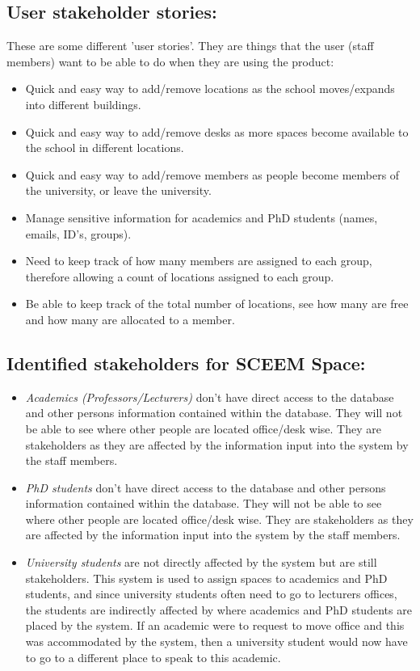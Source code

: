 \documentclass[11pt,a4paper]{article}
\begin{document}
\subsection{User stakeholder stories:}
These are some different 'user stories'. They are things that the user (staff members) want to be able to do when they are using the product:
\begin{itemize}
        \item Quick and easy way to add/remove locations as the school moves/expands  into different buildings.
        \item Quick and easy way to add/remove desks as more spaces become available to the school in different locations.
        \item Quick and easy way to add/remove members as people become members of the university, or leave the university.
        \item Manage sensitive information for academics and PhD students (names, emails, ID's, groups).
        \item Need to keep track of how many members are assigned to each group, therefore allowing a count of locations assigned to each group.
        \item Be able to keep track of the total number of locations, see how many are free and how many are allocated to a member.
    \end{itemize}

\subsection{Identified stakeholders for SCEEM Space:}
\begin{itemize}
    \item \textit{Academics (Professors/Lecturers)} don’t have direct access to the database and other persons information contained within the database. They will not be able to see where other people are located office/desk wise. They are stakeholders as they are affected by the information input into the system by the staff members.
    \item \textit{PhD students} don’t have direct access to the database and other persons information contained within the database. They will not be able to see where other people are located office/desk wise. They are stakeholders as they are affected by the information input into the system by the staff members.
    \item \textit{University students} are not directly affected by the system but are still stakeholders. This system is used to assign spaces to academics and PhD students, and since university students often need to go to lecturers offices, the students are indirectly affected by where academics and PhD students are placed by the system. If an academic were to request to move office and this was accommodated by the system, then a university student would now have to go to a different place to speak to this academic.
\end{itemize}
\end{document}
